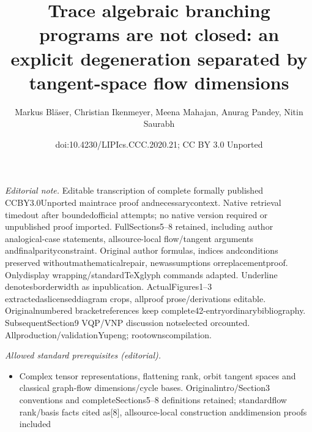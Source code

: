 \documentclass[10pt,a4paper]{article}
\title{Trace algebraic branching programs are not closed: an explicit degeneration separated by tangent-space flow dimensions}
\author{Markus Bläser, Christian Ikenmeyer, Meena Mahajan, Anurag Pandey, Nitin Saurabh}
\date{doi:10.4230/LIPIcs.CCC.2020.21; CC BY 3.0 Unported}
\begin{document}
\maketitle
\noindent\textit{Editorial note.} Editable transcription of complete formally published CCBY3.0Unported maintrace proof andnecessarycontext. Native retrieval timedout after boundedofficial attempts; no native version required or unpublished proof imported. FullSections5–8 retained, including author analogical-case statements, allsource-local flow/tangent arguments andfinalparityconstraint. Original author formulas, indices andconditions preserved withoutmathematicalrepair, newassumptions orreplacementproof. Onlydisplay wrapping/standardTeXglyph commands adapted. Underline denotesborderwidth as inpublication. ActualFigures1–3 extractedaslicenseddiagram crops, allproof prose/derivations editable. Originalnumbered bracketreferences keep complete42-entryordinarybibliography. SubsequentSection9 VQP/VNP discussion notselected orcounted. Allproduction/validationYupeng; rootownscompilation.\par\medskip
\noindent\textit{Allowed standard prerequisites (editorial).}\begin{itemize}
\item Complex tensor representations, flattening rank, orbit tangent spaces and classical graph-flow dimensions/cycle bases. Originalintro/Section3 conventions and completeSections5–8 definitions retained; standardflow rank/basis facts cited as[8], allsource-local construction anddimension proofs included
\end{itemize}\medskip
\end{document}
